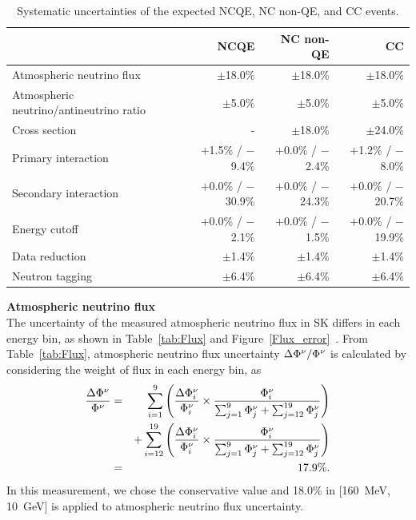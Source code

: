 \begin{table}[h]
	\centering
	\caption[Systematic uncertainties of the expected NCQE, NC non-QE, and CC events]{
	Systematic uncertainties of the expected NCQE, NC non-QE, and CC events.
	}\label{tab:sys}
	\vs
	\begin{tabular}{lrrr} \hline \hline
		                                        & NCQE                 & NC non-QE            & CC                   \\ \hline
		Atmospheric neutrino flux               & $\pm$18.0\%          & $\pm$18.0\%          & $\pm$18.0\%          \\
		Atmospheric neutrino/antineutrino ratio & $\pm$5.0\%           & $\pm$5.0\%           & $\pm$5.0\%           \\
		Cross section                           & -                    & $\pm$18.0\%          & $\pm$24.0\%          \\
		Primary interaction                     & $+$1.5\% / $-$9.4\%  & $+$0.0\% / $-$2.4\%  & $+$1.2\% / $-$8.0\%  \\
		Secondary interaction                   & $+$0.0\% / $-$30.9\% & $+$0.0\% / $-$24.3\% & $+$0.0\% / $-$20.7\% \\
		Energy cutoff                           & $+$0.0\% / $-$2.1\%  & $+$0.0\% / $-$1.5\%  & $+$0.0\% / $-$19.9\% \\
		Data reduction                          & $\pm$1.4\%           & $\pm$1.4\%           & $\pm$1.4\%           \\
		Neutron tagging                         & $\pm$6.4\%           & $\pm$6.4\%           & $\pm$6.4\%           \\ \hline \hline
	\end{tabular}
\end{table}

\textbf{Atmospheric neutrino flux}\\
\hs
The uncertainty of the measured atmospheric neutrino flux in SK differs in each energy bin, as shown in Table~\ref{tab:Flux} and Figure~\ref{Flux_error}~\cite{2016Richard}.
From Table~\ref{tab:Flux}, atmospheric neutrino flux uncertainty $\Delta{\rm \Phi}^{\nu}/{\rm \Phi}^{\nu}$ is calculated by considering the weight of flux in each energy bin, as
\begin{eqnarray}
	{\Delta{\rm \Phi}^{\nu} \over {\rm \Phi}^{\nu}} &=& \sum_{i=1}^{9} \Bigg({\Delta{\rm \Phi}_{i}^{\nu} \over {\rm \Phi}_{i}^{\nu}} \times {{\rm \Phi}_{i}^{\nu} \over \sum_{j=1}^{9} {\rm \Phi}_{j}^{\nu} + \sum_{j=12}^{19} {\rm \Phi}_{j}^{\nu}}\Bigg) \nonumber \\
																									& & + \sum_{i=12}^{19} \Bigg({\Delta{\rm \Phi}_{i}^{\nu} \over {\rm \Phi}_{i}^{\nu}} \times {{\rm \Phi}_{i}^{\nu} \over \sum_{j=1}^{9} {\rm \Phi}_{j}^{\nu} + \sum_{j=12}^{19} {\rm \Phi}_{j}^{\nu}}\Bigg) \nonumber \\
																									&=& 17.9\%.
\end{eqnarray}
In this measurement, we chose the conservative value and 18.0\% in [160~MeV, 10~GeV] is applied to atmospheric neutrino flux uncertainty.\\

